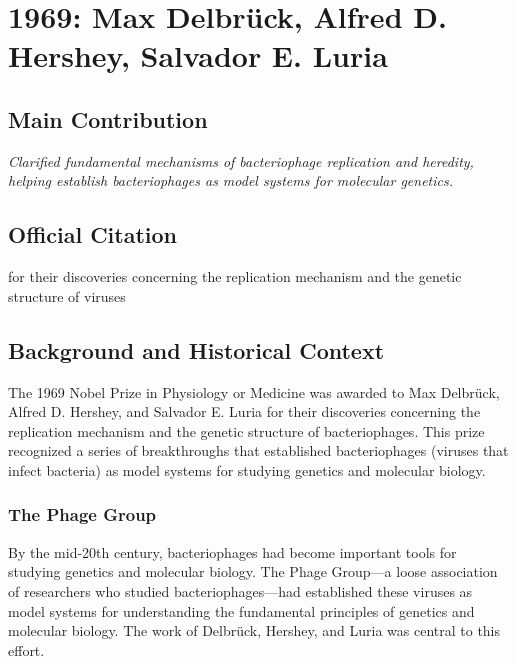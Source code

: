 \chapter[1969 --- Delbr\"uck, Hershey, and Luria]{1969: Max Delbr\"uck, Alfred D. Hershey, Salvador E. Luria}
\label{ch:1969_Delbruck}

\section*{Main Contribution}

\textit{Clarified fundamental mechanisms of bacteriophage replication and heredity, helping establish bacteriophages as model systems for molecular genetics.}\cite{nobel-1969,lecture-1969,lecture-hershey-1969,lecture-luria-1969}

\section{Official Citation}

for their discoveries concerning the replication mechanism and the genetic structure of viruses

\section{Background and Historical Context}

The 1969 Nobel Prize in Physiology or Medicine was awarded to Max Delbr\"uck, Alfred D. Hershey, and Salvador E. Luria for their discoveries concerning the replication mechanism and the genetic structure of bacteriophages. This prize recognized a series of breakthroughs that established bacteriophages (viruses that infect bacteria) as model systems for studying genetics and molecular biology.

\subsection{The Phage Group}

By the mid-20th century, bacteriophages had become important tools for studying genetics and molecular biology. The Phage Group---a loose association of researchers who studied bacteriophages---had established these viruses as model systems for understanding the fundamental principles of genetics and molecular biology. The work of Delbr\"uck, Hershey, and Luria was central to this effort.

